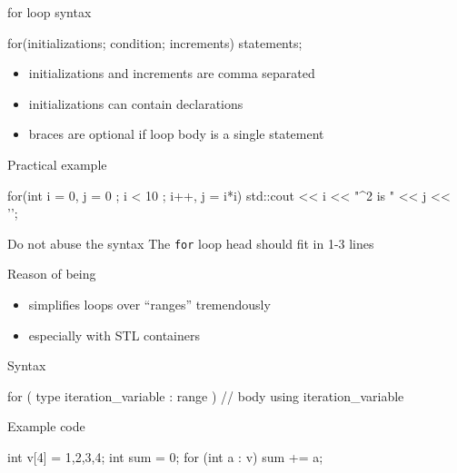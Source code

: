 \begin{frame}[fragile]
  \begin{block}{for loop syntax}
    \begin{cppcode*}{}
      for(initializations; condition; increments) {
        statements;
      }
    \end{cppcode*}
    \vspace{-0.2cm}
    \begin{itemize}
      \item initializations and increments are comma separated
      \item initializations can contain declarations
      \item braces are optional if loop body is a single statement
    \end{itemize}
  \end{block}
  \pause
  \begin{exampleblock}{Practical example}
    \begin{cppcode*}{}
      for(int i = 0, j = 0 ; i < 10 ; i++, j = i*i) {
        std::cout << i << "^2 is " << j << '\n';
      }
    \end{cppcode*}
  \end{exampleblock}
  \pause
  \begin{alertblock}{Do not abuse the syntax}
    The \texttt{for} loop head should fit in 1-3 lines
  \end{alertblock}
\end{frame}

\begin{frame}[fragile]
  \begin{block}{Reason of being}
    \begin{itemize}
    \item simplifies loops over ``ranges'' tremendously
    \item especially with STL containers
    \end{itemize}
  \end{block}
  \begin{block}{Syntax}
    \begin{cppcode*}{}
      for ( type iteration_variable : range ) {
        // body using iteration_variable
      }
    \end{cppcode*}
  \end{block}
  \begin{exampleblock}{Example code}
    \begin{cppcode*}{}
      int v[4] = {1,2,3,4};
      int sum = 0;
      for (int a : v) { sum += a; }
    \end{cppcode*}
  \end{exampleblock}
\end{frame}

